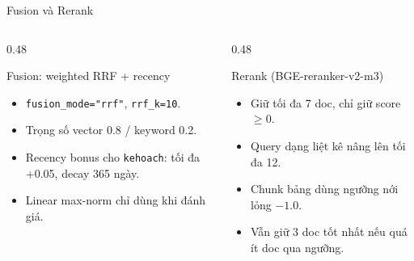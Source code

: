 \documentclass[t, aspectratio=169]{beamer}
\begin{document}
	\begin{frame}{Fusion và Rerank}
		\begin{columns}[T,onlytextwidth]
			\begin{column}{0.48\textwidth}
				\begin{block}{Fusion: weighted RRF + recency}
					\begin{itemize}
						\item \texttt{fusion\_mode="rrf"}, \texttt{rrf\_k=10}.
						\item Trọng số vector 0.8 / keyword 0.2.
						\item Recency bonus cho \texttt{kehoach}: tối đa +0.05, decay 365 ngày.
						\item Linear max-norm chỉ dùng khi đánh giá.
					\end{itemize}
				\end{block}
			\end{column}
			\begin{column}{0.48\textwidth}
				\begin{block}{Rerank (BGE-reranker-v2-m3)}
					\begin{itemize}
						\item Giữ tối đa 7 doc, chỉ giữ score $\geq 0$.
						\item Query dạng liệt kê nâng lên tối đa 12.
						\item Chunk bảng dùng ngưỡng nới lỏng $-1.0$.
						\item Vẫn giữ 3 doc tốt nhất nếu quá ít doc qua ngưỡng.
					\end{itemize}
				\end{block}
			\end{column}
		\end{columns}
	\end{frame}
\end{document}
